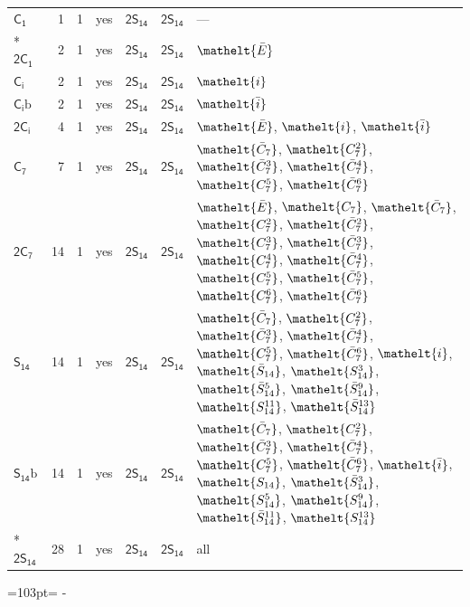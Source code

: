 \documentclass[10pt,a4paper]{article}
\newcommand{\needspace}[1]{\par\penalty-100\begingroup\dimen0=#1\relax\dimen2=\pagegoal
  \advance\dimen2-\pagetotal\ifdim\dimen0>\dimen2\relax\ifdim\dimen2>0pt\vfil\break\fi\fi
  \endgroup}
\numberwithin{equation}{section}
\newcommand{\eltfont}[1]{{\let\sigma\eltsigma\mathelt{#1}}}
\newcommand{\grp}[1]{\mathsf{#1}}
\newcommand{\cls}[1]{\eltfont{#1}}
\newcommand{\barred}[1]{\bar{#1}}
\newcommand{\secondclass}{\mathrm{b}}
\newlength{\fillwidth}\newlength{\cellwidth}\newlength{\colwidth}
\begin{document}
{\begin{longtable}{@{}lrrlll>{\RaggedRight\arraybackslash}p{\fillwidth}@{}}
\bottomrule\endfoot\endlastfoot
\href{C1.pdf}{$\grp{C_{1}}$} & 1 & 1 & yes & \href{2S14.pdf}{$\grp{2S_{14}}$} & \href{2S14.pdf}{$\grp{2S_{14}}$} & ---\\*
\href{2C1.pdf}{$\grp{2C_{1}}$} & 2 & 1 & yes & \href{2S14.pdf}{$\grp{2S_{14}}$} & \href{2S14.pdf}{$\grp{2S_{14}}$} & $\cls{\barred{E}}$\\
\href{S2.pdf}{$\grp{C_{i}}$} & 2 & 1 & yes & \href{2S14.pdf}{$\grp{2S_{14}}$} & \href{2S14.pdf}{$\grp{2S_{14}}$} & $\cls{i}$\\
\href{S2b.pdf}{$\grp{C_{i}}\secondclass$} & 2 & 1 & yes & \href{2S14.pdf}{$\grp{2S_{14}}$} & \href{2S14.pdf}{$\grp{2S_{14}}$} & $\cls{\barred{i}}$\\
\href{2S2.pdf}{$\grp{2C_{i}}$} & 4 & 1 & yes & \href{2S14.pdf}{$\grp{2S_{14}}$} & \href{2S14.pdf}{$\grp{2S_{14}}$} & $\cls{\barred{E}}$, $\cls{i}$, $\cls{\barred{i}}$\\
\href{C7.pdf}{$\grp{C_{7}}$} & 7 & 1 & yes & \href{2S14.pdf}{$\grp{2S_{14}}$} & \href{2S14.pdf}{$\grp{2S_{14}}$} & $\cls{\barred{C}_{7}}$, $\cls{C_{7}^{2}}$, $\cls{\barred{C}_{7}^{3}}$, $\cls{\barred{C}_{7}^{4}}$, $\cls{C_{7}^{5}}$, $\cls{\barred{C}_{7}^{6}}$\\
\href{2C7.pdf}{$\grp{2C_{7}}$} & 14 & 1 & yes & \href{2S14.pdf}{$\grp{2S_{14}}$} & \href{2S14.pdf}{$\grp{2S_{14}}$} & $\cls{\barred{E}}$, $\cls{C_{7}}$, $\cls{\barred{C}_{7}}$, $\cls{C_{7}^{2}}$, $\cls{\barred{C}_{7}^{2}}$, $\cls{C_{7}^{3}}$, $\cls{\barred{C}_{7}^{3}}$, $\cls{C_{7}^{4}}$, $\cls{\barred{C}_{7}^{4}}$, $\cls{C_{7}^{5}}$, $\cls{\barred{C}_{7}^{5}}$, $\cls{C_{7}^{6}}$, $\cls{\barred{C}_{7}^{6}}$\\
\href{S14.pdf}{$\grp{S_{14}}$} & 14 & 1 & yes & \href{2S14.pdf}{$\grp{2S_{14}}$} & \href{2S14.pdf}{$\grp{2S_{14}}$} & $\cls{\barred{C}_{7}}$, $\cls{C_{7}^{2}}$, $\cls{\barred{C}_{7}^{3}}$, $\cls{\barred{C}_{7}^{4}}$, $\cls{C_{7}^{5}}$, $\cls{\barred{C}_{7}^{6}}$, $\cls{i}$, $\cls{\barred{S}_{14}}$, $\cls{S_{14}^{3}}$, $\cls{\barred{S}_{14}^{5}}$, $\cls{\barred{S}_{14}^{9}}$, $\cls{S_{14}^{11}}$, $\cls{\barred{S}_{14}^{13}}$\\
\href{S14b.pdf}{$\grp{S_{14}}\secondclass$} & 14 & 1 & yes & \href{2S14.pdf}{$\grp{2S_{14}}$} & \href{2S14.pdf}{$\grp{2S_{14}}$} & $\cls{\barred{C}_{7}}$, $\cls{C_{7}^{2}}$, $\cls{\barred{C}_{7}^{3}}$, $\cls{\barred{C}_{7}^{4}}$, $\cls{C_{7}^{5}}$, $\cls{\barred{C}_{7}^{6}}$, $\cls{\barred{i}}$, $\cls{S_{14}}$, $\cls{\barred{S}_{14}^{3}}$, $\cls{S_{14}^{5}}$, $\cls{S_{14}^{9}}$, $\cls{\barred{S}_{14}^{11}}$, $\cls{S_{14}^{13}}$\\*
\href{2S14.pdf}{$\grp{2S_{14}}$} & 28 & 1 & yes & \href{2S14.pdf}{$\grp{2S_{14}}$} & \href{2S14.pdf}{$\grp{2S_{14}}$} & all\\
\bottomrule\end{longtable}}
\needspace{103pt}
\end{document}
